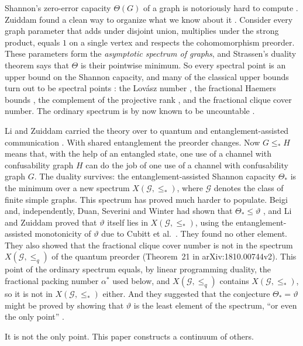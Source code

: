 \documentclass[11pt]{article}
\theoremstyle{definition}
\newcommand{\vt}{\vartheta}
\newcommand{\cG}{\mathcal G}
\newcommand{\Xs}{X(\cG,\le_*)}
\begin{document}
Shannon's zero-error capacity $\Theta(G)$ of a graph is notoriously hard to
compute \cite{Shannon1956}.  Zuiddam found a clean way to organize what we
know about it \cite{Zuiddam2019}.  Consider every graph parameter that adds
under disjoint union, multiplies under the strong product, equals $1$ on a
single vertex and respects the cohomomorphism preorder.  These parameters form
the \emph{asymptotic spectrum of graphs}, and Strassen's duality theorem
\cite{Strassen1988} says that $\Theta$ is their pointwise minimum.  So every
spectral point is an upper bound on the Shannon capacity, and many of the
classical upper bounds turn out to be spectral points \cite{Zuiddam2019}: the
Lov\'asz number \cite{Lovasz1979}, the fractional Haemers bounds
\cite{Haemers1979,Blasiak2013,BukhCox2019}, the complement of the projective
rank \cite{CMRSSW2014,MancinskaRoberson2016}, and the fractional clique cover
number.  The ordinary spectrum is by now known to be uncountable
\cite{Vrana2021,Vrana2022}.

Li and Zuiddam carried the theory over to quantum and entanglement-assisted
communication \cite{LiZuiddam2020}.  With shared entanglement the preorder
changes.  Now $G\le_*H$ means that, with the help of an entangled state, one
use of a channel with confusability graph $H$ can do the job of one use of a
channel with confusability graph $G$.  The duality survives: the
entanglement-assisted Shannon capacity $\Theta_*$ is the minimum over a new
spectrum $\Xs$, where $\cG$ denotes the class of finite simple graphs.  This
spectrum has proved much harder to populate.  Beigi and,
independently, Duan, Severini and Winter had shown that $\Theta_*\le\vt$
\cite{Beigi2010,DSW2013}, and Li and Zuiddam proved that $\vt$ itself lies in
$\Xs$, using the entanglement-assisted monotonicity of $\vt$ due to Cubitt et
al.~\cite{CMRSSW2014}.  They found no other element.  They also showed
that the fractional clique cover number is not in the spectrum
$X(\cG,\le_q)$ of the quantum preorder \cite[Theorem~22]{LiZuiddam2020}
(Theorem~21 in arXiv:1810.00744v2).  This point of the ordinary spectrum
equals, by linear programming duality, the fractional packing number
$\alpha^*$ used below, and $X(\cG,\le_q)$ contains $\Xs$, so it is not in
$\Xs$ either.  And they
suggested that the conjecture $\Theta_*=\vt$ might be proved by showing that
$\vt$ is the least element of the spectrum, ``or even the only point''
\cite{LiZuiddam2020}.

It is not the only point.  This paper constructs a continuum of others.
\end{document}
